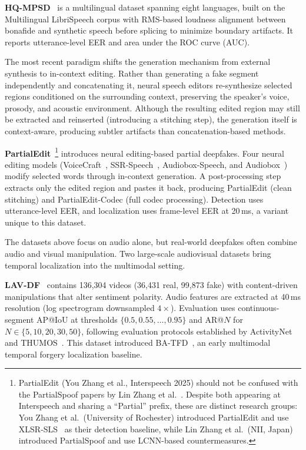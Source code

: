 \documentclass[journal]{IEEEtran}
\begin{document}
\textbf{HQ-MPSD}~\cite{li2025hqmpsd} is a multilingual dataset spanning eight languages, built on the Multilingual LibriSpeech corpus with RMS-based loudness alignment between bonafide and synthetic speech before splicing to minimize boundary artifacts. It reports utterance-level EER and area under the ROC curve (AUC).

The most recent paradigm shifts the generation mechanism from external synthesis to in-context editing. Rather than generating a fake segment independently and concatenating it, neural speech editors re-synthesize selected regions conditioned on the surrounding context, preserving the speaker's voice, prosody, and acoustic environment. Although the resulting edited region may still be extracted and reinserted (introducing a stitching step), the generation itself is context-aware, producing subtler artifacts than concatenation-based methods.

\textbf{PartialEdit}~\cite{zhang2025partialedit}\footnote{PartialEdit (You Zhang et al., Interspeech 2025) should not be confused with the PartialSpoof papers by Lin Zhang et al.~\cite{zhang2021initialinvestigation,zhang2023partialspoof}. Despite both appearing at Interspeech and sharing a ``Partial'' prefix, these are distinct research groups: You Zhang et al.\ (University of Rochester) introduced PartialEdit and use XLSR-SLS~\cite{zhang2024xlrsls} as their detection baseline, while Lin Zhang et al.\ (NII, Japan) introduced PartialSpoof and use LCNN-based countermeasures.} introduces neural editing-based partial deepfakes. Four neural editing models (VoiceCraft~\cite{peng2024voicecraft}, SSR-Speech~\cite{wang2025ssrspeech}, Audiobox-Speech, and Audiobox~\cite{vyas2023audiobox}) modify selected words through in-context generation. A post-processing step extracts only the edited region and pastes it back, producing PartialEdit (clean stitching) and PartialEdit-Codec (full codec processing). Detection uses utterance-level EER, and localization uses frame-level EER at 20\,ms, a variant unique to this dataset.

The datasets above focus on audio alone, but real-world deepfakes often combine audio and visual manipulation. Two large-scale audiovisual datasets bring temporal localization into the multimodal setting.

\textbf{LAV-DF}~\cite{cai2022lavdf,cai2023lavdf_cviu} contains 136,304 videos (36,431 real, 99,873 fake) with content-driven manipulations that alter sentiment polarity. Audio features are extracted at 40\,ms resolution (log spectrogram downsampled $4\times$). Evaluation uses continuous-segment AP@IoU at thresholds $\{0.5, 0.55, \ldots, 0.95\}$ and AR@$N$ for $N \in \{5, 10, 20, 30, 50\}$, following evaluation protocols established by ActivityNet~\cite{heilbron2015activitynet} and THUMOS~\cite{idrees2017thumos}. This dataset introduced BA-TFD~\cite{cai2022lavdf}, an early multimodal temporal forgery localization baseline.
\end{document}
